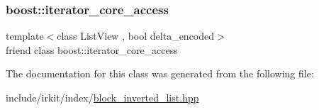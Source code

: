 \subsubsection{\texorpdfstring{boost\+::iterator\+\_\+core\+\_\+access}{boost::iterator\_core\_access}}
{\footnotesize\ttfamily template$<$class List\+View , bool delta\+\_\+encoded$>$ \\
friend class boost\+::iterator\+\_\+core\+\_\+access\hspace{0.3cm}{\ttfamily [friend]}}



The documentation for this class was generated from the following file\+:\begin{DoxyCompactItemize}
\item 
include/irkit/index/\mbox{\hyperlink{block__inverted__list_8hpp}{block\+\_\+inverted\+\_\+list.\+hpp}}\end{DoxyCompactItemize}
